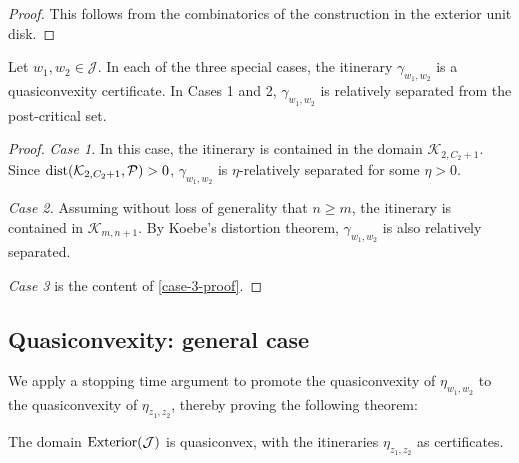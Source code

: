 \begin{proof}
    This follows from the combinatorics of the construction in the exterior unit disk. 
\end{proof}

\begin{lemma}
\label{case 1 rel. sep}
Let $w_1,w_2 \in \mathcal J$. In each of the three special cases, the itinerary $\gamma _{w_1,w_2}$ is a quasiconvexity certificate. In Cases 1 and 2, $\gamma _{w_1,w_2}$ is relatively separated from the post-critical set.
\end{lemma}

\begin{proof}
\emph{Case 1.} In this case, the itinerary is contained in the domain $\mathcal K_{2, C_2+1}$.
Since $\operatorname{dist}(\mathcal K_{2, C_2+1}, \mathcal P)>0$, $\gamma _{w_1,w_2}$ is $\eta$-relatively separated for some $\eta>0$. 

\emph{Case 2.}
Assuming without loss of generality that $n \geq m$, the itinerary is contained in $\mathcal K_{m,n+1}$. By Koebe's distortion theorem, $\gamma _{w_1,w_2}$ is also relatively separated.

\emph{Case 3} is the content of \cref{case-3-proof}.
\end{proof}

\subsection{Quasiconvexity: general case}
We apply a stopping time argument to promote the quasiconvexity of $\eta_{w_1,w_2}$ to the quasiconvexity of $\eta_{z_1,z_2}$, thereby proving the following theorem:

\begin{theorem} \label{quasiconvex-Cauliflower}
	The domain $\operatorname{Exterior}(\mathcal{J})$ is quasiconvex, with the itineraries $\eta_{z_1,z_2}$ as certificates.
\end{theorem}

